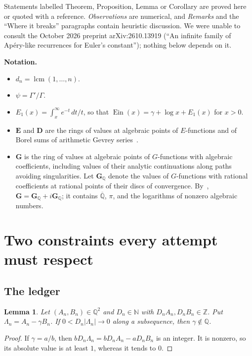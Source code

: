 \documentclass[11pt,a4paper]{article}
\newtheorem{lemma}[theorem]{Lemma}
\theoremstyle{definition}
\theoremstyle{remark}
\newcommand{\Q}{\mathbb Q}
\newcommand{\Z}{\mathbb Z}
\newcommand{\N}{\mathbb N}
\newcommand{\Qbar}{\overline{\mathbb Q}}
\newcommand{\bG}{\mathbf G}
\newcommand{\bE}{\mathbf E}
\newcommand{\bD}{\mathbf D}
\DeclareMathOperator{\Ein}{Ein}
\DeclareMathOperator{\lcm}{lcm}
\numberwithin{equation}{section}
\begin{document}
Statements labelled Theorem, Proposition, Lemma or Corollary are proved here or quoted with a reference. \emph{Observations} are numerical, and \emph{Remarks} and the ``Where it breaks'' paragraphs contain heuristic discussion. We were unable to consult the October 2026 preprint arXiv:2610.13919 (``An infinite family of Ap\'ery-like recurrences for Euler's constant''); nothing below depends on it.

\medskip\noindent\textbf{Notation.}
\begin{itemize}[leftmargin=2em]
\item $d_n=\lcm(1,\dots,n)$.
\item $\psi=\Gamma'/\Gamma$.
\item $E_1(x)=\int_x^\infty e^{-t}\,dt/t$, so that $\Ein(x)=\gamma+\log x+E_1(x)$ for $x>0$.
\item $\bE$ and $\bD$ are the rings of values at algebraic points of $E$-functions and of Borel sums of arithmetic Gevrey series~\cite{p4:FR16,p4:FR18,p4:FR24}.
\item $\bG$ is the ring of values at algebraic points of $G$-functions with algebraic coefficients, including values of their analytic continuations along paths avoiding singularities. Let $\bG_\Q$ denote the values of $G$-functions with rational coefficients at rational points of their discs of convergence. By~\cite[Thm.~1]{p4:FR14}, $\bG=\bG_\Q+i\bG_\Q$; it contains $\Qbar$, $\pi$, and the logarithms of nonzero algebraic numbers.
\end{itemize}

\section{Two constraints every attempt must respect}\label{p4:sec:constraints}

\subsection{The ledger}

\begin{lemma}\label{p4:lem:ledger}
Let $(A_n,B_n)\in\Q^2$ and $D_n\in\N$ with $D_nA_n,D_nB_n\in\Z$. Put $\Lambda_n=A_n-\gamma B_n$. If $0<D_n|\Lambda_n|\to0$ along a subsequence, then $\gamma\notin\Q$.
\end{lemma}

\begin{proof}
If $\gamma=a/b$, then $bD_n\Lambda_n=bD_nA_n-aD_nB_n$ is an integer. It is nonzero, so its absolute value is at least $1$, whereas it tends to $0$.
\end{proof}
\end{document}
